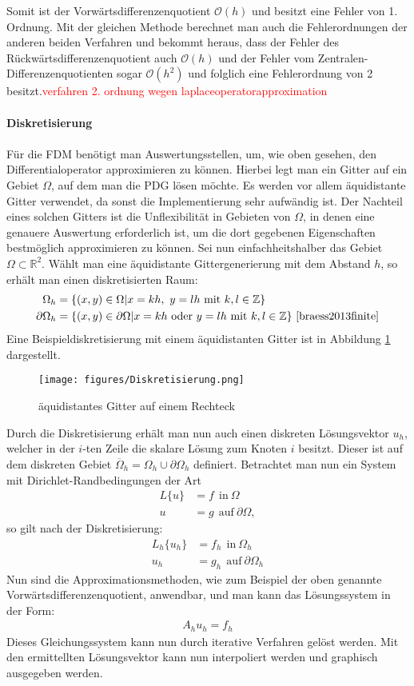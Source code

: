 \documentclass[a4paper,11pt]{article}
\newcommand{\col}[2][red]{\textcolor{#1}{#2}}
\begin{document}
Somit ist der Vorwärtsdifferenzenquotient $\mathcal{O}(h)$ und besitzt eine Fehler von 1. Ordnung. Mit der gleichen Methode berechnet man auch die Fehlerordnungen der anderen beiden Verfahren und bekommt heraus, dass der Fehler des Rückwärtsdifferenzenquotient auch $\mathcal{O}(h)$ und der Fehler vom Zentralen-Differenzenquotienten sogar $\mathcal{O}(h^2)$ und folglich eine Fehlerordnung von 2 besitzt.\col{verfahren 2. ordnung wegen laplaceoperatorapproximation}\\\\
\textbf{Diskretisierung}\\\\
Für die FDM benötigt man Auswertungsstellen, um, wie oben gesehen, den Differentialoperator approximieren zu können. Hierbei legt man ein Gitter auf ein Gebiet $\Omega$, auf dem man die PDG lösen möchte. Es werden vor allem äquidistante Gitter verwendet, da sonst die Implementierung sehr aufwändig ist. Der Nachteil eines solchen Gitters ist die Unflexibilität in Gebieten von $\Omega$, in denen eine genauere Auswertung erforderlich ist, um die dort gegebenen Eigenschaften bestmöglich approximieren zu können. Sei nun einfachheitshalber das Gebiet $\Omega\subset\mathbb{R}^2$. Wählt man eine äquidistante Gittergenerierung mit dem Abstand $h$, so erhält man einen diskretisierten Raum:
\begin{align}
 \Omega_h&=\{(x,y)\in\Omega|x=kh,~y=lh~\text{mit}~k,l\in\mathbb{Z}\}\nonumber\\
 \partial\Omega_h&=\{(x,y)\in\partial\Omega|x=kh~\text{oder}~y=lh~\text{mit}~k,l\in\mathbb{Z}\}\nonumber~\cite{braess2013finite}
\end{align}
Eine Beispieldiskretisierung mit einem äquidistanten Gitter ist in Abbildung \ref{fig:diskGit} dargestellt.
\begin{figure}[ht]
	\centering
	\texttt{[image: figures/Diskretisierung.png]}
	\caption[Diskretiesierung]{äquidistantes Gitter auf einem Rechteck}
	\label{fig:diskGit}
\end{figure}
Durch die Diskretisierung erhält man nun auch einen diskreten Lösungsvektor $u_h$, welcher in der $i$-ten Zeile die skalare Lösung zum Knoten $i$ besitzt. Dieser ist auf dem diskreten Gebiet $\overline{\Omega}_h=\Omega_h\cup\partial\Omega_h$ definiert. Betrachtet man nun ein System mit Dirichlet-Randbedingungen der Art
\begin{align}
 L\{u\}&=f~~\text{in}~\Omega\nonumber\\
 u&=g~~\text{auf}~\partial\Omega\nonumber,
\end{align}
so gilt nach der Diskretisierung:
\begin{align}
 L_h\{u_h\}&=f_h~~\text{in}~\Omega_h\nonumber\\
 u_h&=g_h~~\text{auf}~\partial\Omega_h\nonumber
\end{align}
Nun sind die Approximationsmethoden, wie zum Beispiel der oben genannte Vorwärtsdifferenzenquotient, anwendbar, und man kann das Lösungssystem in der Form:
\begin{align}
 A_hu_h=f_h
\end{align}
Dieses Gleichungssystem kann nun durch iterative Verfahren gelöst werden. Mit den ermittellten Lösungsvektor kann nun interpoliert werden und graphisch ausgegeben werden.
\end{document}
